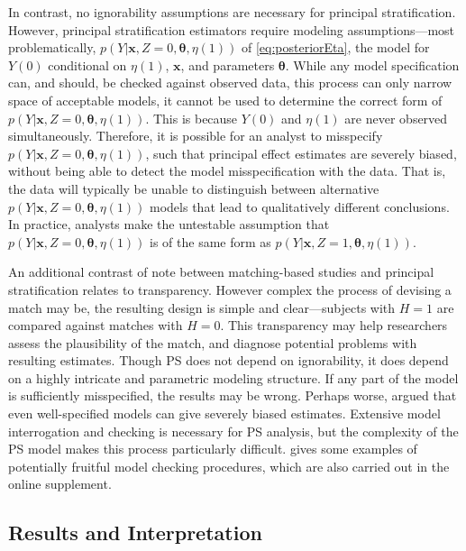 \documentclass{article}\usepackage[]{graphicx}\usepackage[]{color}
\begin{document}
In contrast, no ignorability assumptions are necessary for principal
stratification.
However, principal stratification estimators require modeling
assumptions---most problematically, $p(Y|\bm{x},Z=0,\bm{\theta},\eta(1))$ of
\eqref{eq:posteriorEta}, the model for $Y(0)$
conditional on $\eta(1)$, $\bm{x}$, and parameters $\bm{\theta}$.
While any model specification can, and should, be checked against
observed data, this process can only narrow space of acceptable
models, it cannot be used to determine the correct form of
$p(Y|\bm{x},Z=0,\bm{\theta},\eta(1))$.
This is because $Y(0)$ and $\eta(1)$ are never observed simultaneously.
Therefore, it is possible for an analyst to misspecify $p(Y|\bm{x},Z=0,\bm{\theta},\eta(1))$, such that principal effect estimates are
severely biased, without being able to detect the model
misspecification with the data.
That is, the data will typically be unable to distinguish between
alternative $p(Y|\bm{x},Z=0,\bm{\theta},\eta(1))$ models that lead to
qualitatively different conclusions.
In practice, analysts make the untestable assumption that $p(Y|\bm{x},Z=0,\bm{\theta},\eta(1))$ is
of the same form as $p(Y|\bm{x},Z=1,\bm{\theta},\eta(1))$.

An additional contrast of note between matching-based studies and
principal stratification relates to transparency.
However complex the process of devising a match may be, the resulting
design is simple and clear---subjects with $H=1$ are compared against
matches with $H=0$.
This transparency may help researchers assess the plausibility of the
match, and diagnose potential problems with resulting estimates.
Though PS does not depend on ignorability, it does depend on a highly
intricate and parametric modeling structure.
If any part of the model is sufficiently misspecified, the results may
be wrong.
Perhaps worse, \citet{feller2016principal} argued that even well-specified
models can give severely biased estimates.
Extensive model interrogation and checking is necessary for PS
analysis, but the complexity of the PS model makes this process
particularly difficult.
\citet{aoas} gives some examples of potentially fruitful model
checking procedures, which are also carried out in the online supplement.

\subsection{Results and Interpretation}
\end{document}
